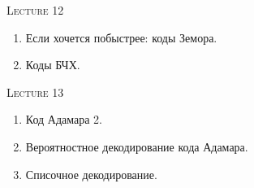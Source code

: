 \centerline{\textsc{Lecture 12}}

\begin{enumerate}
    \item Если хочется побыстрее: коды Земора.
    \item Коды БЧХ.
\end{enumerate}


\centerline{\textsc{Lecture 13}}

\begin{enumerate}
    \item Код Адамара 2.
    \item Вероятностное декодирование кода Адамара.
    \item Списочное декодирование.
\end{enumerate}